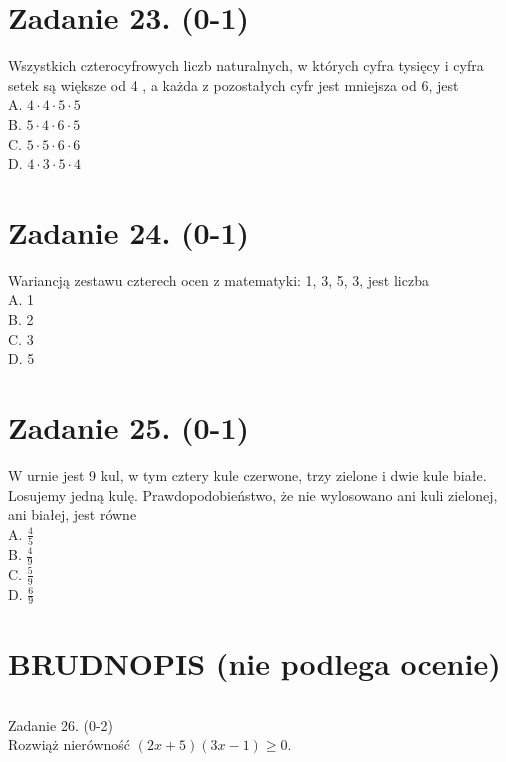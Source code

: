 \documentclass[10pt]{article}
\begin{document}
\section*{Zadanie 23. (0-1)}
Wszystkich czterocyfrowych liczb naturalnych, w których cyfra tysięcy i cyfra setek są większe od 4 , a każda z pozostałych cyfr jest mniejsza od 6, jest\\
A. \(4 \cdot 4 \cdot 5 \cdot 5\)\\
B. \(5 \cdot 4 \cdot 6 \cdot 5\)\\
C. \(5 \cdot 5 \cdot 6 \cdot 6\)\\
D. \(4 \cdot 3 \cdot 5 \cdot 4\)

\section*{Zadanie 24. (0-1)}
Wariancją zestawu czterech ocen z matematyki: 1, 3, 5, 3, jest liczba\\
A. 1\\
B. 2\\
C. 3\\
D. 5

\section*{Zadanie 25. (0-1)}
W urnie jest 9 kul, w tym cztery kule czerwone, trzy zielone i dwie kule białe. Losujemy jedną kulę. Prawdopodobieństwo, że nie wylosowano ani kuli zielonej, ani białej, jest równe\\
A. \(\frac{4}{5}\)\\
B. \(\frac{4}{9}\)\\
C. \(\frac{5}{9}\)\\
D. \(\frac{6}{9}\)

\section*{BRUDNOPIS (nie podlega ocenie)}
\(\qquad\)

Zadanie 26. (0-2)\\
Rozwiąż nierówność \((2 x+5)(3 x-1) \geq 0\).
\end{document}
